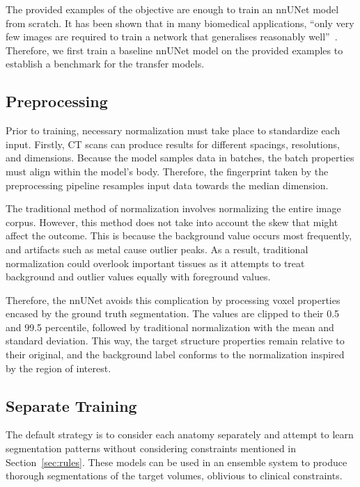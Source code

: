 \documentclass[11pt,twoside]{report}
\begin{document}
The provided examples of the objective are enough to train an nnUNet model from scratch. It has been shown that in many biomedical applications, ``only very few images are required to train a network that generalises reasonably well''~\cite{DBLP:journals/corr/CicekALBR16}. Therefore, we first train a baseline nnUNet model on the provided examples to establish a benchmark for the transfer models.

\subsection{Preprocessing}\label{sec:nnunet-preprocessing}

Prior to training, necessary normalization must take place to standardize each input. Firstly, CT scans can produce results for different spacings, resolutions, and dimensions. Because the model samples data in batches, the batch properties must align within the model's body. Therefore, the fingerprint taken by the preprocessing pipeline resamples input data towards the median dimension. 

The traditional method of normalization involves normalizing the entire image corpus. However, this method does not take into account the skew that might affect the outcome. This is because the background value occurs most frequently, and artifacts such as metal cause outlier peaks. As a result, traditional normalization could overlook important tissues as it attempts to treat background and outlier values equally with foreground values.

Therefore, the nnUNet avoids this complication by processing voxel properties encased by the ground truth segmentation. The values are clipped to their 0.5 and 99.5 percentile, followed by traditional normalization with the mean and standard deviation. This way, the target structure properties remain relative to their original, and the background label conforms to the normalization inspired by the region of interest.

\subsection{Separate Training}

The default strategy is to consider each anatomy separately and attempt to learn segmentation patterns without considering constraints mentioned in Section~\ref{sec:rules}. These models can be used in an ensemble system to produce thorough segmentations of the target volumes, oblivious to clinical constraints. 
\end{document}
